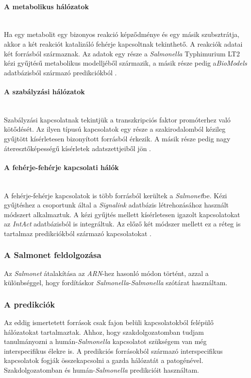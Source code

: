 \documentclass[a4paper,12pt]{article}
\begin{document}
			\paragraph{A metabolikus hálózatok} \mbox{}\\
				Ha egy metabolit egy bizonyos reakció képződménye és egy másik szubsztrátja, akkor a két reakciót katalizáló fehérje kapcsoltnak tekinthető. A reakciók adatai két forrásból származnak. Az adatok egy része a \textit{Salmonella} Typhimurium LT2 kézi gyűjtésű metabolikus modelljéből származik, a másik része pedig a\textit{BioModels} adatbázisból származó predikciókból \cite{salmonet}.

			\paragraph{A szabályzási hálózatok} \mbox{}\\
				Szabályzási kapcsolatnak tekintjük a transzkripciós faktor promóterhez való kötődését. Az ilyen típusú kapcsolatok egy része a szakirodalomból kézileg gyűjtött kísérletesen bizonyított forrásból érkezik. A másik része pedig nagy áteresztőképességű kísérletek adatszettjeiből jön \cite{salmonet}.

			\paragraph{A fehérje-fehérje kapcsolati hálók} \mbox{}\\
				A fehérje-fehérje kapcsolatok is több forrásból kerültek a \textit{Salmonet}be. Kézi gyűjtéshez a csoportunk által a \textit{Signalink} adatbázis létrehozásához használt módszert alkalmaztuk. A kézi gyűjtés mellett kísérletesen igazolt kapcsolatokat az \textit{IntAct} adatbázisból is integráltuk. Az előző két módszer mellett ez a réteg is tartalmaz predikciókból származó kapcsolatokat 	\cite{salmonet}.


			\subsubsection{A Salmonet feldolgozása}
			Az \textit{Salmonet} átalakítása az \textit{ARN}-hez hasonló módon történt, azzal a különbséggel, hogy fordításkor \textit{Salmonella}-\textit{Salmonella} szótárat használtam.

			\subsubsection{A predikciók}
			Az eddig ismertetett források csak fajon belüli kapcsolatokból felépülő hálózatokat tartalmaztak. Ahhoz, hogy szakdolgozatomban tudjam tanulmányozni a humán-\textit{Salmonella} kapcsolatot szükségem van még interspecifikus élekre is. A predikciós forrásokból származó interspecifikus kapcsolatok fogják összekapcsolni a gazda hálózatát a patogénével. Szakdolgozatomban \cite{Krishnadev} és \cite{Kshirsagar} humán-\textit{Salmonella} predikcióit használtam.
\end{document}
